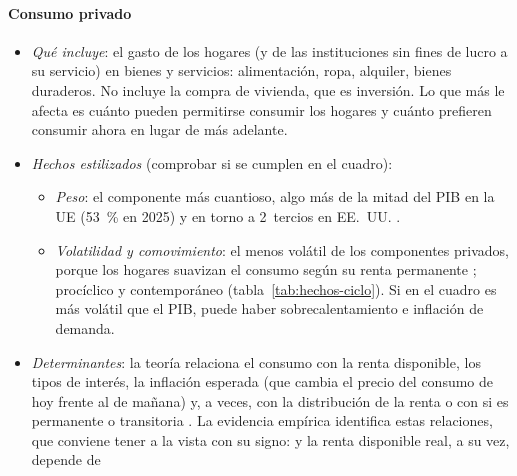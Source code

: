 \documentclass[11pt]{article}
\begin{document}
\paragraph{Consumo privado}
\begin{itemize}
\item \emph{Qué incluye}: el gasto de los hogares (y de las instituciones sin fines de lucro a su servicio) en bienes y servicios: alimentación, ropa, alquiler, bienes duraderos. No incluye la compra de vivienda, que es inversión. Lo que más le afecta es cuánto pueden permitirse consumir los hogares y cuánto prefieren consumir ahora en lugar de más adelante.
\item \emph{Hechos estilizados} (comprobar si se cumplen en el cuadro):
  \begin{itemize}
  \item \emph{Peso}: el componente más cuantioso, algo más de la mitad del PIB en la UE (53~\% en 2025) y en torno a 2~tercios en EE.~UU. \parencite{Eurostat2026nama10gdp,BM2026WDI}.
  \item \emph{Volatilidad y comovimiento}: el menos volátil de los componentes privados, porque los hogares suavizan el consumo según su renta permanente ; procíclico y contemporáneo (tabla~\ref{tab:hechos-ciclo}). Si en el cuadro es más volátil que el PIB, puede haber sobrecalentamiento e inflación de demanda.
  \end{itemize}
\item \emph{Determinantes}: la teoría relaciona el consumo con la renta disponible, los tipos de interés, la inflación esperada (que cambia el precio del consumo de hoy frente al de mañana) y, a veces, con la distribución de la renta o con si es permanente o transitoria . La evidencia empírica identifica estas relaciones, que conviene tener a la vista con su signo:
y la renta disponible real, a su vez, depende de
  \begin{itemize}

\end{itemize}
\end{itemize}
\end{document}
